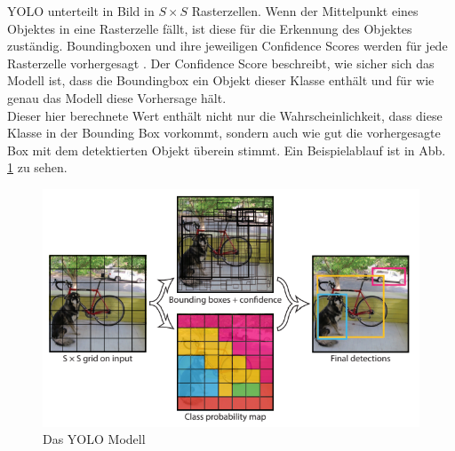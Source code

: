{{	YOLO unterteilt in Bild in $S \times S $ Rasterzellen. Wenn der Mittelpunkt eines Objektes in eine Rasterzelle fällt, ist diese für die Erkennung des Objektes zuständig. Boundingboxen und ihre jeweiligen Confidence Scores werden für jede Rasterzelle vorhergesagt \citep{Redmon2016}.
	Der Confidence Score beschreibt, wie sicher sich das Modell ist, dass die Boundingbox ein Objekt dieser Klasse enthält und für wie genau das Modell diese Vorhersage hält. \\
	Dieser hier berechnete Wert enthält nicht nur die Wahrscheinlichkeit, dass diese Klasse in der Bounding Box vorkommt, sondern auch wie gut die vorhergesagte Box mit dem detektierten Objekt überein stimmt. Ein Beispielablauf ist in Abb. \ref{YOLO_Model} zu sehen.
	\begin{figure}[ht]
		\centering
		\includegraphics*[scale = 2, keepaspectratio, trim=2 2 2 2 ]{images/YOLO/YOLO_model.png}
		\caption[Das YOLO Modell]{Das YOLO Modell\citep{Redmon2016}}
		\label{YOLO_Model}
 	\end{figure}

	


}}
